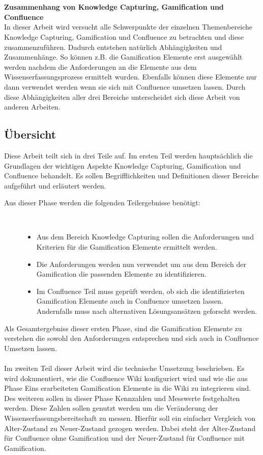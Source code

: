 \documentclass[a4paper,12pt]{scrartcl}
\begin{document}
\\\\
\textbf{Zusammenhang von Knowledge Capturing, Gamification und Confluence}\\
In dieser Arbeit wird versucht alle Schwerpunkte der einzelnen Themenbereiche Knowledge Capturing, Gamification und Confluence zu betrachten und diese zusammenzuführen. Dadurch entstehen natürlich Abhängigkeiten und Zusammenhänge. So können z.B. die Gamification Elemente erst ausgewählt werden nachdem die Anforderungen an die Elemente aus dem Wissenserfassungsprozess ermittelt wurden. Ebenfalls können diese Elemente nur dann verwendet werden wenn sie sich mit Confluence umsetzen lassen. Durch diese Abhängigkeiten aller drei Bereiche unterscheidet sich diese Arbeit von anderen Arbeiten.
\subsection{Übersicht}
Diese Arbeit teilt sich in drei Teile auf. Im ersten Teil werden hauptsächlich die Grundlagen der wichtigen Aspekte Knowledge Capturing, Gamification und Confluence behandelt. Es sollen Begrifflichkeiten und Definitionen dieser Bereiche aufgeführt und erläutert werden. 
\begin{description}
   \item[Aus dieser Phase werden die folgenden Teilergebnisse benötigt:]~\par
   \begin{itemize}
      \item Aus dem Bereich Knowledge Capturing sollen die Anforderungen und Kriterien für die Gamification Elemente ermittelt werden.
      \item Die Anforderungen werden nun verwendet um aus dem Bereich der Gamification die passenden Elemente zu identifizieren.
      \item Im Confluence Teil muss geprüft werden, ob sich die identifizierten Gamification Elemente auch in Confluence umsetzen lassen. Andernfalls muss nach alternativen Lösungsansätzen geforscht werden.
   \end{itemize}
\end{description}
Als Gesamtergebniss dieser ersten Phase, sind die Gamification Elemente zu verstehen die sowohl den Anforderungen entsprechen und sich auch in Confluence Umsetzen lassen.
\\\\
Im zweiten Teil dieser Arbeit wird die technische Umsetzung beschrieben. Es wird dokumentiert, wie die Confluence Wiki konfiguriert wird und wie die aus Phase Eins erarbeiteten Gamification Elemente in die Wiki zu integrieren sind. Des weiteren sollen in dieser Phase Kennzahlen und Messwerte festgehalten werden. Diese Zahlen sollen genutzt werden um die Veränderung der Wissenserfassungsbereitschaft zu messen. Hierfür soll ein einfacher Vergleich von Alter-Zustand zu Neuer-Zustand gezogen werden. Dabei steht der Alter-Zustand für Confluence ohne Gamification und der Neuer-Zustand für Confluence mit Gamification.
\end{document}
